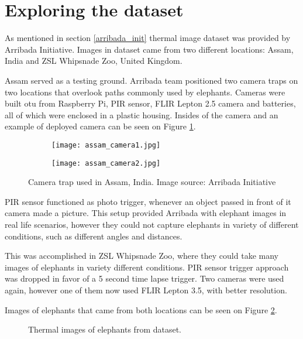 \section{ Exploring the dataset} \label{exploring_dataset}

As mentioned in section \ref{arribada_init} thermal image dataset was provided by Arribada Initiative\cite{wildlabs-winners}\cite{arribada-assam}.
Images in dataset came from two different locations: Assam, India and ZSL Whipsnade Zoo, United Kingdom.

Assam served as a testing ground.
Arribada team positioned two camera traps on two locations that overlook paths commonly used by elephants.
Cameras were built otu from Raspberry Pi, PIR sensor, FLIR Lepton 2.5 camera and batteries, all of which were enclosed in a plastic housing.
Insides of the camera and an example of deployed camera can be seen on Figure \ref{assam_camera}.

\begin{figure}[ht]
    \begin{subfigure}{0.5\textwidth}
        \centering
        \texttt{[image: assam\_camera1.jpg]} 
    \end{subfigure}
    \begin{subfigure}{0.5\textwidth}
        \centering
        \texttt{[image: assam\_camera2.jpg]}
    \end{subfigure}
    \caption{Camera trap used in Assam, India. Image source: Arribada Initiative \cite{arribada-assam}}
    \label{assam_camera}
\end{figure}

PIR sensor functioned as photo trigger, whenever an object passed in front of it camera made a picture.
This setup provided Arribada with elephant images in real life scenarios, however they could not capture elephants in variety of different conditions, such as different angles and distances.

This was accomplished in ZSL Whipsnade Zoo, where they could take many images of elephants in variety different conditions\cite{dataset_collection}.
PIR sensor trigger approach was dropped in favor of a 5 second time lapse trigger.
Two cameras were used again, however one of them now used FLIR Lepton 3.5, with better resolution.

Images of elephants that came from both locations can be seen on Figure \ref{four_elephants}.

\begin{figure}[ht]
    \centering
    \caption{Thermal images of elephants from dataset.}
    \label{four_elephants}
\end{figure}

